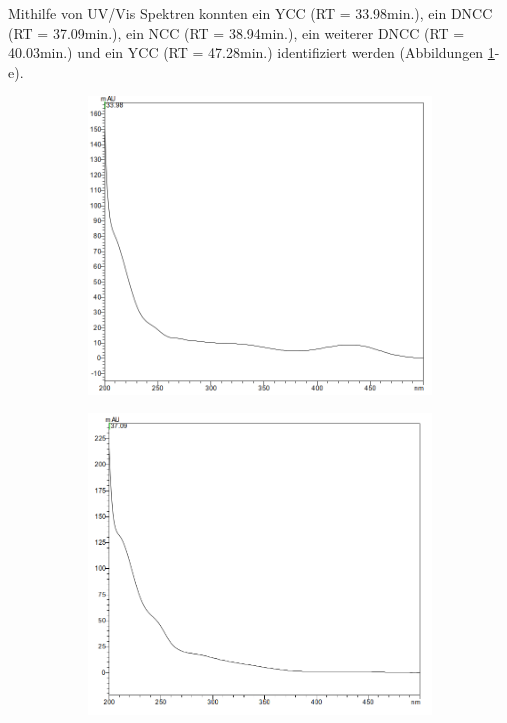 \pagebreak
Mithilfe von UV/Vis Spektren konnten ein YCC (RT = 33.98min.), ein DNCC (RT = 37.09min.), ein NCC (RT = 38.94min.), ein weiterer DNCC (RT = 40.03min.) und ein YCC (RT = 47.28min.) identifiziert werden (Abbildungen \ref{fig:YCC3398}-e). 

\begin{figure}[!htbp]
  \begin{subfigure}[b]{0.5\textwidth}
    \includegraphics[width=\textwidth]{figures/Kapitel6/Reaktion3h/YCC3398.png}
    \caption{}
    \label{fig:YCC3398}
  \end{subfigure}
  \hfill
  \begin{subfigure}[b]{0.5\textwidth}
    \includegraphics[width=\textwidth]{figures/Kapitel6/Reaktion3h/DNCC3709.png}
    \caption{}
    \label{fig:DNCC3709}
  \end{subfigure}
  

\end{figure}

